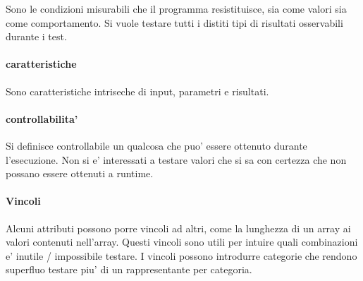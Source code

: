 Sono le condizioni misurabili che il programma resistituisce, sia come valori sia come comportamento.
Si vuole testare tutti i distiti tipi di risultati osservabili durante i test.

\paragraph{caratteristiche}

Sono caratteristiche intriseche di input, parametri e risultati.

\paragraph{controllabilita'}

Si definisce controllabile un qualcosa che puo' essere ottenuto durante l'esecuzione.
Non si e' interessati a testare valori che si sa con certezza che non possano essere ottenuti a runtime.

\paragraph{Vincoli}

Alcuni attributi possono porre vincoli ad altri, come la lunghezza di un array ai valori contenuti nell'array.
Questi vincoli sono utili per intuire quali combinazioni e' inutile / impossibile testare.
I vincoli possono introdurre categorie che rendono superfluo testare piu' di un rappresentante per categoria.